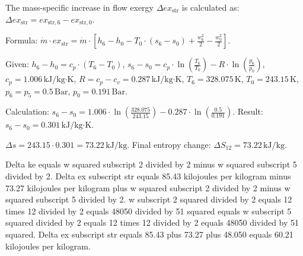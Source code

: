 The mass-specific increase in flow exergy \( \Delta ex_{\text{str}} \) is calculated as:  
\( \Delta ex_{\text{str}} = ex_{\text{str},6} - ex_{\text{str},0} \).  

Formula:  
\( \dot{m} \cdot ex_{\text{str}} = \dot{m} \cdot \left[ h_6 - h_0 - T_0 \cdot (s_6 - s_0) + \frac{w_6^2}{2} - \frac{w_0^2}{2} \right] \).  

Given:  
\( h_6 - h_0 = c_p \cdot (T_6 - T_0) \),  
\( s_6 - s_0 = c_p \cdot \ln \left( \frac{T_6}{T_0} \right) - R \cdot \ln \left( \frac{p_6}{p_0} \right) \),  
\( c_p = 1.006 \, \text{kJ/kg·K} \), \( R = c_p - c_v = 0.287 \, \text{kJ/kg·K} \),  
\( T_6 = 328.075 \, \text{K} \), \( T_0 = 243.15 \, \text{K} \),  
\( p_6 = p_5 = 0.5 \, \text{Bar} \), \( p_0 = 0.191 \, \text{Bar} \).  

Calculation:  
\( s_6 - s_0 = 1.006 \cdot \ln \left( \frac{328.075}{243.15} \right) - 0.287 \cdot \ln \left( \frac{0.5}{0.191} \right) \).  
Result: \( s_6 - s_0 = 0.301 \, \text{kJ/kg·K} \).  

\( \Delta s = 243.15 \cdot 0.301 = 73.22 \, \text{kJ/kg} \).  
Final entropy change: \( \Delta S_{12} = 73.22 \, \text{kJ/kg} \).

Delta ke equals w squared subscript 2 divided by 2 minus w squared subscript 5 divided by 2.  
Delta ex subscript str equals 85.43 kilojoules per kilogram minus 73.27 kilojoules per kilogram plus w squared subscript 2 divided by 2 minus w squared subscript 5 divided by 2.  
w subscript 2 squared divided by 2 equals 12 times 12 divided by 2 equals 48050 divided by 51 squared equals w subscript 5 squared divided by 2 equals 12 times 12 divided by 2 equals 48050 divided by 51 squared.  
Delta ex subscript str equals 85.43 plus 73.27 plus 48.050 equals 60.21 kilojoules per kilogram.